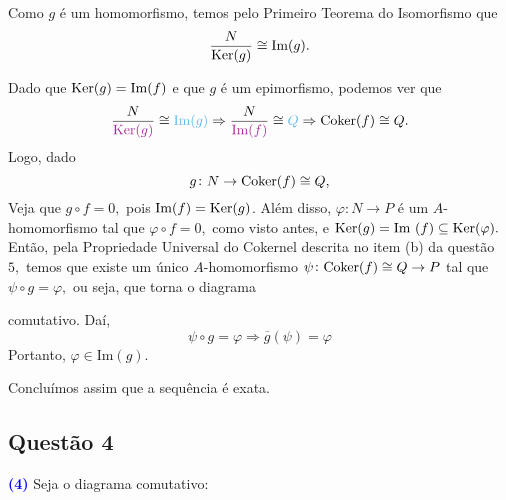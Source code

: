 \documentclass[11pt,a4paper]{article}
\newcommand{\questao}[1]{\subsection{Questão #1} \textcolor{blue}{\bf(#1)}}
\begin{document}
\begin{itemize}
\begin{itemize}
        Como $g$ é um homomorfismo, temos pelo Primeiro Teorema do Isomorfismo que
        \[
        \frac{N}{{\rm Ker}(g)} \cong \mbox{Im}(g).
        \]
        
        Dado que ${\rm Ker}(g) = \mbox{Im}(f)$ e que $g$ é um epimorfismo, podemos ver que
            \[
        \frac{N}{\textcolor{Mulberry}{\Ker(g)}} \cong \textcolor{CornflowerBlue}{\mbox{Im}(g)} \Rightarrow  \frac{N}{\textcolor{Mulberry}{\mbox{Im}(f)}} \cong \textcolor{CornflowerBlue}{Q} \Rightarrow \Coker(f) \cong Q.
        \]
        Logo, dado
        \[
        g \colon N \to {\rm Coker}(f) \cong Q,
        \]
Veja que $g \circ f = 0,$ pois $\mbox{Im}(f) = {\rm Ker}(g)$. Além disso, $\varphi \colon N \to P$ é um $A$-homomorfismo tal que $\varphi \circ f = 0,$ como visto antes, e ${\rm Ker}(g) = \mbox{Im }(f) \subseteq {\rm Ker}(\varphi).$ Então, pela Propriedade Universal do Cokernel descrita no item (b) da questão $5,$ temos que existe um único $A$-homomorfismo $\psi \colon {\rm Coker}(f) \cong Q \to P$ tal que $\psi \circ g = \varphi,$ ou seja, que torna o diagrama
\begin{center}
\end{center}


 
comutativo. Daí,
\[
\psi \circ g = \varphi \Rightarrow \boxed{\overline{g}(\psi) = \varphi}
\]
Portanto, $\varphi \in \mbox{Im}(g).$


    \end{itemize}
    
    Concluímos assim que a sequência é exata.
\end{itemize}


\questao{4} Seja o diagrama comutativo:
\begin{center}
\end{center}
\end{document}
